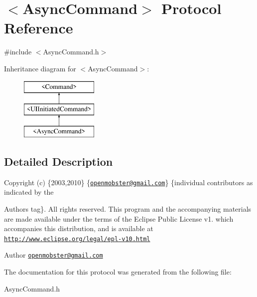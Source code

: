 \hypertarget{protocol_async_command-p}{
\section{$<$\-Async\-Command$>$ \-Protocol \-Reference}
\label{protocol_async_command-p}
}


{\ttfamily \#include $<$\-Async\-Command.\-h$>$}

\-Inheritance diagram for $<$\-Async\-Command$>$\-:\begin{figure}[H]
\begin{center}
\leavevmode
\includegraphics[height=3.000000cm]{protocol_async_command-p}
\end{center}
\end{figure}


\subsection{\-Detailed \-Description}
\-Copyright (c) \{2003,2010\} \{\href{mailto:openmobster@gmail.com}{\tt openmobster@gmail.\-com}\} \{individual contributors as indicated by the \begin{DoxyAuthor}{\-Authors}
tag\}. \-All rights reserved. \-This program and the accompanying materials are made available under the terms of the \-Eclipse \-Public \-License v1. which accompanies this distribution, and is available at \href{http://www.eclipse.org/legal/epl-v10.html}{\tt http\-://www.\-eclipse.\-org/legal/epl-\/v10.\-html}
\end{DoxyAuthor}
\begin{DoxyAuthor}{\-Author}
\href{mailto:openmobster@gmail.com}{\tt openmobster@gmail.\-com} 
\end{DoxyAuthor}


\-The documentation for this protocol was generated from the following file\-:\begin{DoxyCompactItemize}
\item 
\-Async\-Command.\-h\end{DoxyCompactItemize}

